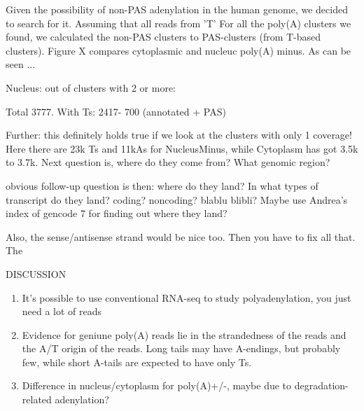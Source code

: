\documentclass[a4paper]{article}
\begin{document}
Given the possibility of non-PAS adenylation in the human genome, we decided to
search for it. Assuming that all reads from 'T' For all the poly(A) clusters we found, we calculated the non-PAS
clusters to PAS-clusters (from T-based clusters). Figure X compares cytoplasmic
and nucleuc poly(A) minus. As can be seen $\ldots$

Nucleus: out of clusters with 2 or more:

Total 3777. With Ts: 2417- 700 (annotated + PAS)

Further: this definitely holds true if we look at the clusters with only 1
coverage! Here there are 23k Ts and 11kAs for NucleusMinus, while Cytoplasm has
got 3.5k to 3.7k. Next question is, where do they come from? What genomic
region?

obvious follow-up question is then: where do they land? In what types of
transcript do they land? coding? noncoding? blablu blibli? Maybe use Andrea's
index of gencode 7 for finding out where they land?

Also, the sense/antisense strand would be nice too. Then you have to fix all
that.
The

%


DISCUSSION

\begin{enumerate}
	\item It's possible to use conventional RNA-seq to study polyadenylation,
		you just need a lot of reads
	\item Evidence for geniune poly(A) reads lie in the strandedness of the
		reads and the A/T origin of the reads. Long tails may have A-endings,
		but probably few, while short A-tails are expected to have only Ts.
	\item Difference in nucleus/cytoplasm for poly(A)+/-, maybe due to
		degradation-related adenylation? 

\end{enumerate}



%
\end{document}
